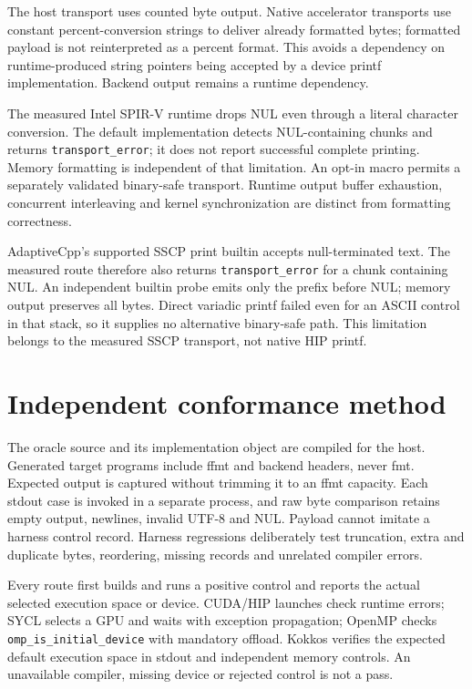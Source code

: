 \documentclass[11pt,letterpaper]{article}
\begin{document}
The host transport uses counted byte output. Native accelerator transports
use constant percent-conversion strings to deliver already formatted bytes;
formatted payload is not reinterpreted as a percent format. This avoids a
dependency on runtime-produced string pointers being accepted by a device
printf implementation. Backend output remains a runtime dependency.

The measured Intel SPIR-V runtime drops NUL even through a literal character
conversion. The default implementation detects NUL-containing chunks and
returns \texttt{transport\_error}; it does not report successful complete
printing. Memory formatting is independent of that limitation. An opt-in
macro permits a separately validated binary-safe transport. Runtime output
buffer exhaustion, concurrent interleaving and kernel synchronization are
distinct from formatting correctness.

AdaptiveCpp's supported SSCP print builtin accepts null-terminated text. The
measured route therefore also returns \texttt{transport\_error} for a chunk
containing NUL. An independent builtin probe emits only the prefix before NUL;
memory output preserves all bytes. Direct variadic printf failed even for an
ASCII control in that stack, so it supplies no alternative binary-safe path.
This limitation belongs to the measured SSCP transport, not native HIP printf.

\section{Independent conformance method}

The oracle source and its implementation object are compiled for the host.
Generated target programs include ffmt and backend headers, never fmt.
Expected output is captured without trimming it to an ffmt capacity. Each
stdout case is invoked in a separate process, and raw byte comparison retains
empty output, newlines, invalid UTF-8 and NUL. Payload cannot imitate a harness
control record. Harness regressions deliberately test truncation, extra and
duplicate bytes, reordering, missing records and unrelated compiler errors.

Every route first builds and runs a positive control and reports the actual
selected execution space or device. CUDA/HIP launches check runtime errors;
SYCL selects a GPU and waits with exception propagation; OpenMP checks
\texttt{omp\_is\_initial\_device} with mandatory offload. Kokkos verifies the
expected default execution space in stdout and independent memory controls.
An unavailable compiler, missing device or rejected control is not a pass.
\end{document}
